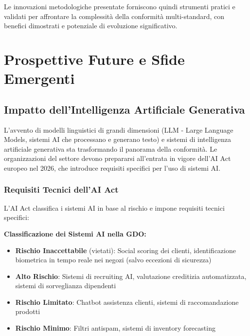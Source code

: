 Le innovazioni metodologiche presentate forniscono quindi strumenti pratici e validati per affrontare la complessità della conformità multi-standard, con benefici dimostrati e potenziale di evoluzione significativo.

\section{\texorpdfstring{Prospettive Future e Sfide Emergenti}{4.8 - Prospettive Future e Sfide Emergenti}}

\subsection{\texorpdfstring{Impatto dell'Intelligenza Artificiale Generativa}{4.8.1 - Impatto dell'Intelligenza Artificiale Generativa}}

L'avvento di modelli linguistici di grandi dimensioni (LLM - Large Language Models, sistemi AI che processano e generano testo) e sistemi di intelligenza artificiale generativa sta trasformando il panorama della conformità. Le organizzazioni del settore devono prepararsi all'entrata in vigore dell'AI Act europeo nel 2026, che introduce requisiti specifici per l'uso di sistemi AI.

\subsubsection{\texorpdfstring{Requisiti Tecnici dell'AI Act}{4.8.1.1 - Requisiti Tecnici dell'AI Act}}

L'AI Act classifica i sistemi AI in base al rischio e impone requisiti tecnici specifici:

\textbf{Classificazione dei Sistemi AI nella GDO:}
\begin{itemize}
    \item \textbf{Rischio Inaccettabile} (vietati): Social scoring dei clienti, identificazione biometrica in tempo reale nei negozi (salvo eccezioni di sicurezza)
    \item \textbf{Alto Rischio}: Sistemi di recruiting AI, valutazione creditizia automatizzata, sistemi di sorveglianza dipendenti
    \item \textbf{Rischio Limitato}: Chatbot assistenza clienti, sistemi di raccomandazione prodotti
    \item \textbf{Rischio Minimo}: Filtri antispam, sistemi di inventory forecasting
\end{itemize}

